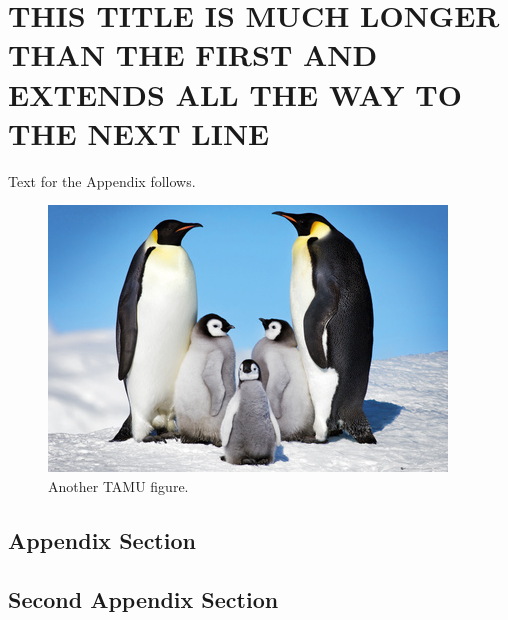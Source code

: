 %
%
%
%	 
%


\chapter{\uppercase {This Title Is Much Longer Than The First and Extends All the Way to the Next Line}}

Text for the Appendix follows.

\begin{figure}[h]
\centering
\includegraphics[scale=.50]{figures/Penguins.jpg}
\caption{Another TAMU figure.}
\label{fig:tamu-fig6}
\end{figure}

\section{Appendix Section}

\section{Second Appendix Section}


\pagebreak{}